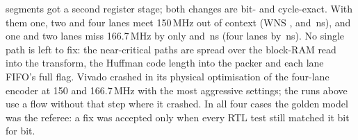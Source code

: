 segments got a second register stage; both changes are bit- and cycle-exact. With them one, two and four lanes meet 150\,MHz out of context (WNS \TopWnsAtOneFifty, \LanesTwoWnsAtOneFifty{} and \LanesFourWnsAtOneFifty\,ns), and one and two lanes miss 166.7\,MHz by only \TopWnsAtOneSixSix{} and \LanesTwoWnsAtOneSixSix\,ns (four lanes by \LanesFourWnsAtOneSixSix\,ns). No single path is left to fix: the near-critical paths are spread over the block-RAM read into the transform, the Huffman code length into the packer and each lane FIFO's full flag. Vivado crashed in its physical optimisation of the four-lane encoder at 150 and 166.7\,MHz with the most aggressive settings; the runs above use a flow without that step where it crashed. In all four cases the golden model was the referee: a fix was accepted only when every RTL test still matched it bit for bit.
